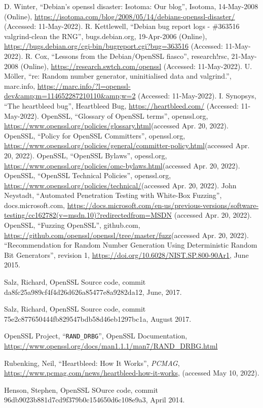 \documentclass[conference]{IEEEtran}
\begin{document}
\begin{thebibliography}{00}
 D. Winter, ``Debian's openssl disaster: Isotoma: Our blog'', Isotoma, 14-May-2008 (Online), 
  \url{https://isotoma.com/blog/2008/05/14/debians-openssl-disaster/} (Accessed: 11-May-2022). 
 R. Kettlewell, ``Debian bug report logs - \#363516 valgrind-clean the RNG'', bugs.debian.org, 19-Apr-2006 (Online), 
  \url{https://bugs.debian.org/cgi-bin/bugreport.cgi?bug=363516} (Accessed: 11-May-2022). 
 R. Cox, ``Lessons from the Debian/OpenSSL fiasco'', research!rsc, 21-May-2008 (Online), 
  \url{https://research.swtch.com/openssl} (Accessed: 11-May-2022). 
 U. Möller, ``re: Random number generator, uninitialised data and valgrind.'', marc.info, 
  \url{https://marc.info/?l=openssl-dev&amp;m=114652287210110&amp;w=2} (Accessed: 11-May-2022). 
 I. Synopsys, ``The heartbleed bug'', Heartbleed Bug,
  \url{https://heartbleed.com/} (Accessed: 11-May-2022). 
 OpenSSL, ``Glossary of OpenSSL terms'', openssl.org,
  \url{https://www.openssl.org/policies/glossary.html}(accessed Apr. 20, 2022).
 OpenSSL, ``Policy for OpenSSL Committers'', openssl.org,
  \url{https://www.openssl.org/policies/general/committer-policy.html}(accessed Apr. 20, 2022).
 OpenSSL, ``OpenSSL Bylaws'', opessl.org, 
  \url{https://www.openssl.org/policies/omc-bylaws.html}(accessed Apr. 20, 2022).
 OpenSSL, ``OpenSSL Technical Policies'', openssl.org,
  \url{https://www.openssl.org/policies/technical/}(accessed Apr. 20, 2022).
 John Neystadt, ``Automated Penetration Testing with White-Box Fuzzing'', docs.microsoft.com,
  \url{https://docs.microsoft.com/en-us/previous-versions/software-testing/cc162782(v=msdn.10)?redirectedfrom=MSDN}
  (accessed Apr. 20, 2022).
 OpenSSL, ``Fuzzing OpenSSL'', github.com,
  \url{https://github.com/openssl/openssl/tree/master/fuzz}(accessed Apr. 20, 2022).
 ``Recommendation for Random Number Generation Using
  Deterministic Random Bit Generators'', revision 1,
  \url{https://doi.org/10.6028/NIST.SP.800-90Ar1}, June 2015.

 Salz, Richard, OpenSSL Source code, commit da8fc25a989cf4f4d26d626a85477e8a9282da12, June, 2017.

 Salz, Richard, OpenSSL Source code, commit 75e2c877650444fb829547bdb58d46eb1297bc1a, August 2017.

 OpenSSL Project, ``\verb|RAND_DRBG|'', OpenSSL
  Documentation,
  \url{https://www.openssl.org/docs/man1.1.1/man7/RAND_DRBG.html}

 Rubenking, Neil, ``Heartbleed: How It Works'', \emph{PCMAG}, \url{https://www.pcmag.com/news/heartbleed-how-it-works}, (accessed May 10, 2022).

 Henson, Stephen, OpenSSL SOurce code, commit 96db9023b881d7cd9f379b0c154650d6c108e9a3, April 2014.

\end{thebibliography}
\end{document}
